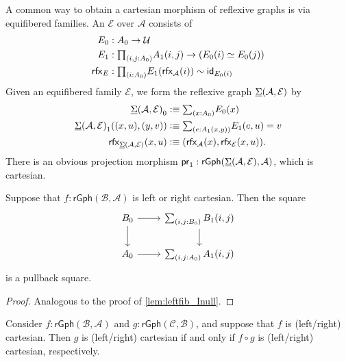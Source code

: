 \begin{eg}
A common way to obtain a cartesian morphism of reflexive graphs is via equifibered families.
An  $\mathcal{E}$ over $\mathcal{A}$ consists of
\begin{align*}
\pts{E} & : \pts{A}\to\UU \\
\edg{E} & : \prd{i,j:\pts{A}} \edg{A}(i,j)\to (\eqv{\pts{E}(i)}{\pts{E}(j)}) \\
\rfx{E} & : \prd{i:\pts{A}} \edg{E}(\rfx{\mathcal{A}}(i))\htpy \idfunc[\pts{E}(i)]
\end{align*}
Given an equifibered family $\mathcal{E}$, we form the reflexive graph $\underline{\Sigma}(\mathcal{A},\mathcal{E})$ by
\begin{align*}
\pts{\msm{\mathcal{A}}{\mathcal{E}}} & \defeq \sm{x:\pts{A}}\pts{E}(x) \\
\edg{\msm{\mathcal{A}}{\mathcal{E}}}((x,u),(y,v)) & \defeq \sm{e:\edg{A}(x,y)} \edg{E}(e,u) = v \\
\rfx{\msm{\mathcal{A}}{\mathcal{E}}}(x,u) & \defeq (\rfx{\mathcal{A}}(x),\rfx{\mathcal{E}}(x,u)).
\end{align*}
There is an obvious projection morphism $\mathsf{pr}_{1} : \mathsf{rGph}(\underline{\Sigma}(\mathcal{A},\mathcal{E}),\mathcal{A})$, which is cartesian.
\end{eg}

\begin{lem}
Suppose that $f:\mathsf{rGph}(\mathcal{B},\mathcal{A})$ is left or right cartesian. Then the square
\begin{equation*}
\begin{tikzcd}
\pts{B} \arrow[r] \arrow[d] & \sm{i,j:\pts{B}}\edg{B}(i,j) \arrow[d] \\
\pts{A} \arrow[r] & \sm{i,j:\pts{A}}\edg{A}(i,j)
\end{tikzcd}
\end{equation*}
is a pullback square.
\end{lem}

\begin{proof}
Analogous to the proof of \cref{lem:leftfib_Inull}.
\end{proof}

\begin{lem}
Consider $f:\mathsf{rGph}(\mathcal{B},\mathcal{A})$ and $g:\mathsf{rGph}(\mathcal{C},\mathcal{B})$, and suppose that $f$ is (left/right) cartesian. Then $g$ is (left/right) cartesian if and only if $f\circ g$ is (left/right) cartesian, respectively.
\end{lem}


